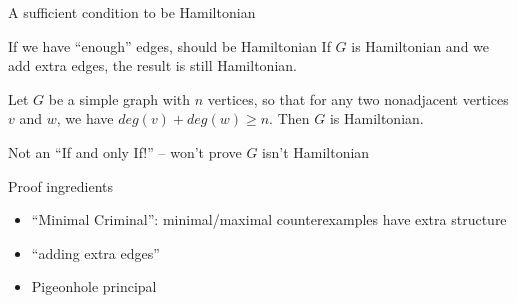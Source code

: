\documentclass{beamer}
\begin{document}
\begin{frame}{A sufficient condition to be Hamiltonian}
\begin{block}{If we have ``enough'' edges, should be Hamiltonian}
  If $G$ is Hamiltonian and we add extra edges, the result is still Hamiltonian.
\end{block}

\begin{theorem}[Ore] Let $G$ be a simple graph with $n$ vertices, so that for any two nonadjacent vertices $v$ and $w$, we have $deg(v)+deg(w)\geq n$.  Then $G$ is Hamiltonian.
\end{theorem}
\alert{Not an ``If and only If!'' -- won't prove $G$ isn't Hamiltonian}
\begin{block}{Proof ingredients}
  \begin{itemize}
    \item ``Minimal Criminal'': minimal/maximal counterexamples have extra structure
    \item ``adding extra edges''
    \item Pigeonhole principal
\end{itemize}
  \end{block}
\end{frame}
\end{document}
